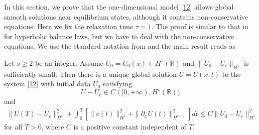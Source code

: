 \documentclass{article}
\theoremstyle{plain}
\begin{document}
In this section, we prove that the one-dimensional model \eqref{12} allows global smooth solutions near equilibrium states, although it contains non-conservative equations. Here we fix the relaxation time $\tau=1$. The proof is similar to that in \cite{yong2004entropy,kawashima2009decay} for hyperbolic balance laws, but we have to deal with the non-conservative equations. We use the standard notation from \cite{yong2004entropy,kawashima2009decay} and the main result reads as

\begin{thm} \label{theoremglobal}
  Let $s \ge 2$ be an integer. Assume $U_0=U_0(x) \in H^s(\mathbb{R})$ and $\|U_0 -U_e\|_{H^s}$ is sufficiently small. Then there is a unique global solution $U=U(x,t)$ to the system \eqref{12} with initial data $U_0$ satisfying
$$
U-U_e \in C([0,+\infty),H^s(\mathbb{R}))
$$
and
\begin{eqnarray}\label{41}
\|U(T)-U_e\|^2_{H^s} + \int_0^T \left[ \|c(t)\|^2_{H^s} + \|\partial_x U(t)\|^2_{H^{s-1}} \right] dt \le C \|U_0 -U_e\|^2_{H^s}
\end{eqnarray}
for all $T>0$, where $C$ is a positive constant independent of $T$.
\end{thm}
\end{document}
